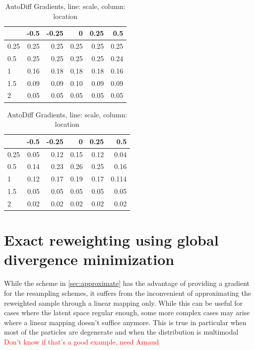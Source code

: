 \documentclass[%
reprint,
amsmath,amssymb,
aps,
]{revtex4-2}
\newcommand\todo[1]{\textcolor{red}{#1}}
\begin{document}
			
			\begin{table}
				\centering
				\begin{tabular}{lrrrrr}
					\toprule
					{} &     -0.5 &     -0.25 &      0 &      0.25 &      0.5 \\
					\midrule
					0.25 &  0.25 &  0.25 &  0.25 &  0.25 &  0.25 \\
					0.5 &  0.25 &  0.25 &  0.25 &  0.25 &  0.24 \\
					1 &  0.16 &  0.18 &  0.18 &  0.18 &  0.16 \\
					1.5 &  0.09 &  0.09 &  0.10 &  0.09 &  0.09 \\
					2 &  0.05 &  0.05 &  0.05 &  0.05 &  0.05 \\
					\bottomrule
				\end{tabular}
				\caption{Theoretical gradients, line: scale, column: location}
			\vfill

				\begin{tabular}{lrrrrr}
					\toprule
					&     -0.5 &     -0.25 &      0 &      0.25 &      0.5 \\
					\midrule
					0.25 &  0.05 &  0.12 &  0.15 &  0.12 &  0.04 \\
					0.5 &  0.14 &  0.23 &  0.26 &  0.25 &  0.16 \\
					1 &  0.12 &  0.17 &  0.19 &  0.17 &  0.114 \\
					1.5 &  0.05 &  0.05 &  0.05 &  0.05 &  0.05 \\
					2 &  0.02 &  0.02 &  0.02 &  0.02 &  0.02 \\
					\bottomrule
				\end{tabular}
				\caption{AutoDiff Gradients, line: scale, column: location}
				\label{tab:gradients}
			\end{table}
	

	\section{Exact reweighting using global divergence minimization}
	\label{sec:exact reweighting}
		While the scheme in \cref{sec:approximate} has the advantage of providing a gradient for the resampling schemes, it suffers from the inconvenient of approximating the reweighted sample through a linear mapping only. While this can be useful for cases where the latent space regular enough, some more complex cases may arise where a linear mapping doesn't suffice anymore. This is true in particular when most of the particles are degenerate and when the distribution is multimodal \todo{Don't know if that's a good example, need Arnaud}
		
\end{document}
